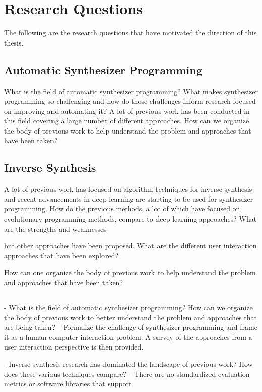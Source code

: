 \section{Research Questions}
The following are the research questions that have motivated the direction of this thesis.

\subsection{Automatic Synthesizer Programming}
What is the field of automatic synthesizer programming? What makes synthesizer programming so challenging and how do those challenges inform research focused on improving and automating it? A lot of previous work has been conducted in this field covering a large number of different approaches. How can we organize the body of previous work to help understand the problem and approaches that have been taken?

\subsection{Inverse Synthesis}
A lot of previous work has focused on algorithm techniques for inverse synthesis and recent advancements in deep learning are starting to be used for synthesizer programming. How do the previous methods, a lot of which have focused on evolutionary programming methods, compare to deep learning approaches? What are the strengths and weaknesses 


but other approaches have been proposed. What are the different user interaction approaches that have been explored? 

How can one organize the body of previous work to help understand the problem and approaches that have been taken?

\subsection{}


- What is the field of automatic synthesizer programming? How can we organize the body of previous work to better understand the problem and approaches that are being taken?
-- Formalize the challenge of synthesizer programming and frame it as a human computer interaction problem. A survey of the approaches from a user interaction perspective is then provided.

- Inverse synthesis research has dominated the landscape of previous work? How does these various techniques compare?
-- There are no standardized evaluation metrics or software libraries that support 

